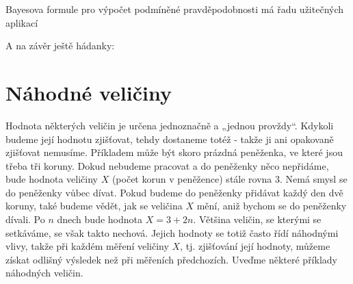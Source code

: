       Bayesova formule pro výpočet podmíněné pravděpodobnosti má řadu užitečných aplikací
      
      
      
      A na závěr ještě hádanky:

      
      
      
      
  \section{Náhodné veličiny}\label{mai:IchapIIIsecIII}
    Hodnota některých veličin je určena jednoznačně a „jednou provždy“. Kdykoli budeme její hodnotu 
    zjišťovat, tehdy dostaneme totéž - takže ji ani opakovaně zjišťovat nemusíme. Příkladem může 
    být skoro prázdná peněženka, ve které jsou třeba tři koruny. Dokud nebudeme pracovat a do 
    peněženky něco nepřidáme, bude hodnota veličiny \(X\) (počet korun v peněžence) stále rovna 
    \num{3}. Nemá smysl se do peněženky vůbec dívat. Pokud budeme do peněženky přidávat každý den 
    dvě koruny, také budeme vědět, jak se veličina \(X\) mění, aniž bychom se do peněženky dívali. 
    Po \(n\) dnech bude hodnota \(X = 3 + 2n\). Většina veličin, se kterými se setkáváme, se však 
    takto nechová. Jejich hodnoty se totiž často řídí náhodnými vlivy, takže při každém
    měření veličiny \(X\), tj. zjišťování její hodnoty, můžeme získat odlišný výsledek než při 
    měřeních předchozích. Uveďme některé příklady náhodných veličin.
    
